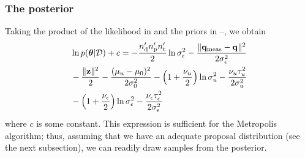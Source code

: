 \subsubsection{The posterior}
Taking the product of the likelihood in  and the priors in --, we obtain
\begin{align}
  & \ln \f{\vparam | \Data} + c = -\frac{\nrdies \nrprocs \nrsteps}{2} \ln \sigma^2_\noise - \frac{\norm{\mvT_\meas - \mvT}^2}{2 \sigma^2_\noise} \nonumber \\
  & {} - \frac{\norm{\vz}^2}{2} - \frac{(\mu_\u - \mu_0)^2}{2 \sigma^2_0} - \left(1 + \frac{\nu_\u}{2}\right) \ln \sigma^2_\u - \frac{\nu_\u \tau_\u^2}{2 \sigma^2_\u} \nonumber \\
  & {} - \left(1 + \frac{\nu_\noise}{2}\right) \ln \sigma^2_\noise - \frac{\nu_\noise \tau_\noise^2}{2 \sigma^2_\noise} \elabel{log-posterior}
\end{align}
where $c$ is some constant. This expression is sufficient for the Metropolis algorithm; thus, assuming that we have an adequate proposal distribution (see the next subsection), we can readily draw samples from the posterior.
